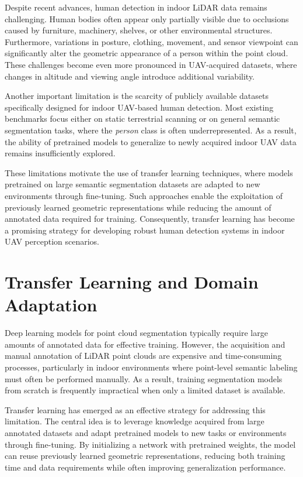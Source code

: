 Despite recent advances, human detection in indoor LiDAR data remains challenging. Human bodies often appear only partially visible due to occlusions caused by furniture, machinery, shelves, or other environmental structures. Furthermore, variations in posture, clothing, movement, and sensor viewpoint can significantly alter the geometric appearance of a person within the point cloud.\cite{Ferreira2023PedestrianLiDAR}  These challenges become even more pronounced in UAV-acquired datasets, where changes in altitude and viewing angle introduce additional variability.

Another important limitation is the scarcity of publicly available datasets specifically designed for indoor UAV-based human detection. Most existing benchmarks focus either on static terrestrial scanning or on general semantic segmentation tasks, where the \textit{person} class is often underrepresented. As a result, the ability of pretrained models to generalize to newly acquired indoor UAV data remains insufficiently explored.

These limitations motivate the use of transfer learning techniques, where models pretrained on large semantic segmentation datasets are adapted to new environments through fine-tuning. Such approaches enable the exploitation of previously learned geometric representations while reducing the amount of annotated data required for training. Consequently, transfer learning has become a promising strategy for developing robust human detection systems in indoor UAV perception scenarios.

\section{Transfer Learning and Domain Adaptation}
\label{sec:transfer_learning}

Deep learning models for point cloud segmentation typically require large amounts of annotated data for effective training. However, the acquisition and manual annotation of LiDAR point clouds are expensive and time-consuming processes, particularly in indoor environments where point-level semantic labeling must often be performed manually. As a result, training segmentation models from scratch is frequently impractical when only a limited dataset is available.

Transfer learning has emerged as an effective strategy for addressing this limitation. The central idea is to leverage knowledge acquired from large annotated datasets and adapt pretrained models to new tasks or environments through fine-tuning. By initializing a network with pretrained weights, the model can reuse previously learned geometric representations, reducing both training time and data requirements while often improving generalization performance.\cite{pan2010survey,pang2022pointmae}

